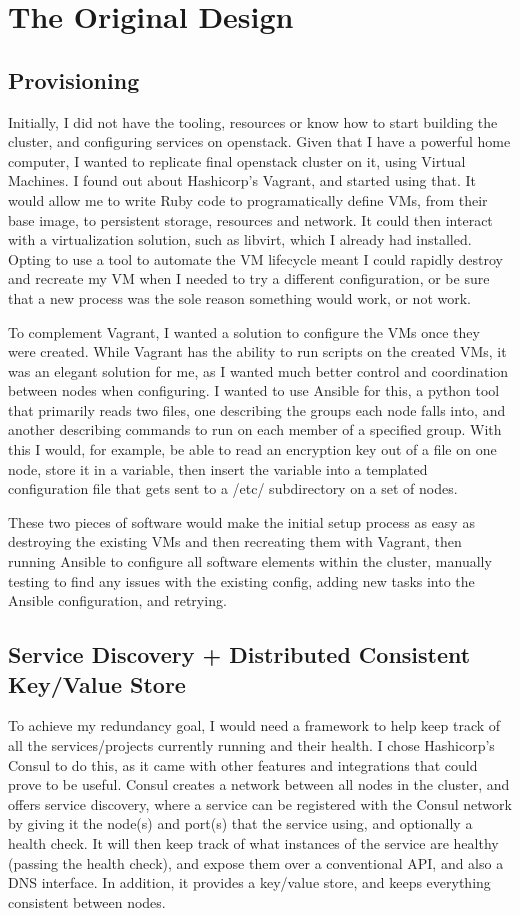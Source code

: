 \documentclass{article}
\begin{document}
\section{The Original Design}
\subsection{Provisioning}
Initially, I did not have the tooling, resources or know how to start building the cluster, and configuring services on openstack. Given that I have a powerful home computer, I wanted to replicate final openstack cluster on it, using Virtual Machines. I found out about Hashicorp's Vagrant, and started using that. It would allow me to write Ruby code to programatically define VMs, from their base image, to persistent storage, resources and network. It could then interact with a virtualization solution, such as libvirt, which I already had installed. Opting to use a tool to automate the VM lifecycle meant I could rapidly destroy and recreate my VM when I needed to try a different configuration, or be sure that a new process was the sole reason something would work, or not work.

To complement Vagrant, I wanted a solution to configure the VMs once they were created. While Vagrant has the ability to run scripts on the created VMs, it was an elegant solution for me, as I wanted much better control and coordination between nodes when configuring. I wanted to use Ansible for this, a python tool that primarily reads two files, one describing the groups each node falls into, and another describing commands to run on each member of a specified group. With this I would, for example, be able to read an encryption key out of a file on one node, store it in a variable, then insert the variable into a templated configuration file that gets sent to a /etc/ subdirectory on a set of nodes.

These two pieces of software would make the initial setup process as easy as destroying the existing VMs and then recreating them with Vagrant, then running Ansible to configure all software elements within the cluster, manually testing to find any issues with the existing config, adding new tasks into the Ansible configuration, and retrying.

\subsection{Service Discovery + Distributed Consistent Key/Value Store}
To achieve my redundancy goal, I would need a framework to help keep track of all the services/projects currently running and their health. I chose Hashicorp's Consul to do this, as it came with other features and integrations that could prove to be useful. Consul creates a network between all nodes in the cluster, and offers service discovery, where a service can be registered with the Consul network by giving it the node(s) and port(s) that the service using, and optionally a health check. It will then keep track of what instances of the service are healthy (passing the health check), and expose them over a conventional API, and also a DNS interface. In addition, it provides a key/value store, and keeps everything consistent between nodes. 
\end{document}
